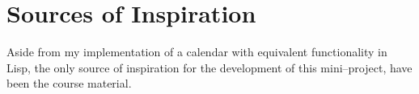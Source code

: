 \chapter{Sources of Inspiration}
Aside from my implementation of a calendar with equivalent functionality in Lisp, the only source of inspiration for the development of this mini--project, have been the course material.
